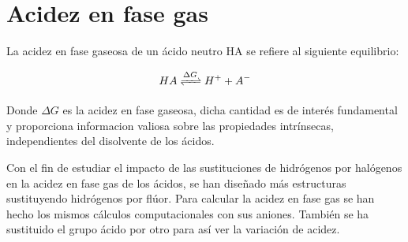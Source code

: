 \begin{comment}También se ha realizado el estudio de estabilidad entre dichos ácidos observando el isómero más estable de cada uno, ver tabla 3.7, se tiene que el ácido más estable es el sulfúrico, seguido del fosfórico y por último, el menos estable de los tres, el ácido carbónico \\

\begin{table}[H]
	\centering
	\begin{tabular}{|c|c|c|c|c|c|}
		\hline
Ácido&$\Delta E$&Ácido&$\Delta E$& Ácido&$\Delta E$\\ \hline
$H_2SO_4$&0,00&$HFSO_4$&0&$HClSO_4$&0\\ \hline
$H_3PO_4$&3,52E+04&$H_2FPO_4$&3,52E+04&$H_2ClPO_4$&3,52E+04\\ \hline
$H_2CO_3$&2,73E+05&$HFCO_3$&2,73E+05&$HClCO_3$&2,73E+05\\ \hline
	\end{tabular}
	\caption{Diferencias de energía en Kcal/mol}
\end{table}
Dicha estabilidad se debe a que la estructura del ácido carbónico es plana (trigonal plana) y por lo tanto más rígida, lo que le proporciona menor estabilidad.\\ Sin embargo, las otras dos estructuras son tetraédricas, en el caso del ácido fosfórico, las distancias P-O son mayores que las distancias S-O, ya que el fósforo es de mayor tamaño que el azufre y menos electronegativo, por consiguiente, distancias O--H mayores, sin posibilidad de formar enlaces de hidrógeno en dicha molécula, mientras que en el ácido sulfúrico si se forma dicho enlace. Ver figura 3.3
\end{comment}

\section{Acidez en fase gas}


La acidez en fase gaseosa de un ácido neutro HA se refiere al siguiente equilibrio:

$$HA\xrightleftharpoons{\Delta G} H^+ + A^-$$

Donde $\Delta G$ es la acidez en fase gaseosa, dicha cantidad es de interés fundamental y proporciona informacion valiosa sobre las propiedades intrínsecas, independientes del disolvente de los ácidos. \cite{quimica3}

Con el fin de estudiar el impacto de las sustituciones de hidrógenos por halógenos en la acidez en fase gas de los ácidos, se han diseñado más estructuras sustituyendo hidrógenos por flúor. Para calcular la acidez en fase gas se han hecho los mismos cálculos computacionales con sus aniones. También se ha sustituido el grupo ácido por otro para así ver la variación de acidez.


